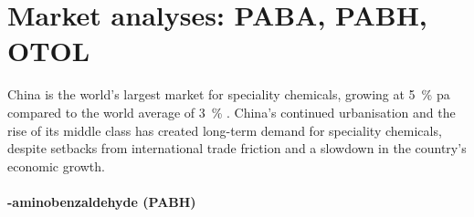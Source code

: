 \section{Market analyses: PABA, PABH, OTOL}
\label{sec:market-analysis}
China is the world’s largest market for speciality chemicals, growing at \SI{5}{\percent} pa compared to the world average of \SI{3}{\percent} \cite{blad_game_nodate}. China’s continued urbanisation and the rise of its middle class has created long-term demand for speciality chemicals, despite setbacks from international trade friction and a slowdown in the country’s economic growth.

\paragraph{\para-aminobenzaldehyde (PABH)}
